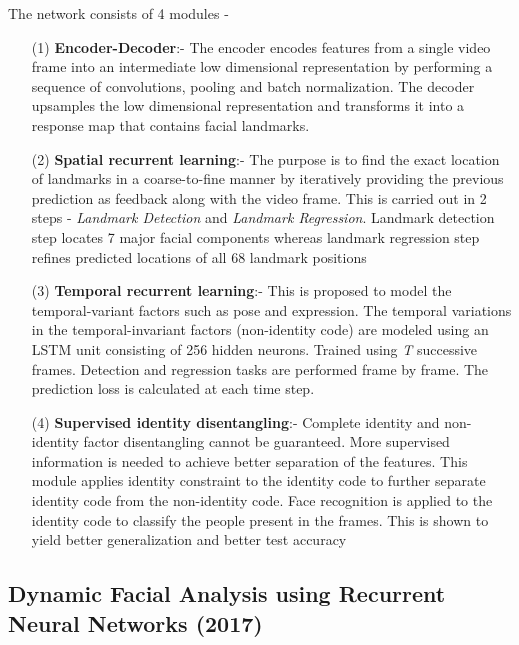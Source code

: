 \documentclass{llncs}
\begin{document}
The network consists of 4 modules -
\begin{itemize}
\item[(1)] \textbf{Encoder-Decoder}:-
The encoder encodes features from a single video frame into an intermediate low dimensional representation by performing a sequence of convolutions, pooling and batch normalization. The decoder upsamples the low dimensional representation and transforms it into a response map that contains facial landmarks.\\


\item[(2)] \textbf{Spatial recurrent learning}:-
The purpose is to find the exact location of landmarks in a coarse-to-fine manner by iteratively providing the previous prediction as feedback along with the video frame. This is carried out in 2 steps - \textit{Landmark Detection} and \textit{Landmark Regression}. Landmark detection step locates 7 major facial components whereas landmark regression step refines predicted locations of all 68 landmark positions\\

\item[(3)] \textbf{Temporal recurrent learning}:-
This is proposed to model the temporal-variant factors such as pose and expression. The temporal variations in the temporal-invariant factors (non-identity code) are modeled using an LSTM unit consisting of 256 hidden neurons.
Trained using \textit{T} successive frames. Detection and regression tasks are performed frame by frame. The prediction loss is calculated at each time step. 
\\

\item[(4)] \textbf{Supervised identity disentangling}:-
Complete identity and non-identity factor disentangling cannot be guaranteed. More supervised information is needed to achieve better separation of the features. This module applies identity constraint to the identity code to further separate identity code from the non-identity code. Face recognition is applied to the identity code to classify the people present in the frames. This is shown to yield better generalization and better test accuracy\\
\end{itemize}
 

\subsection{Dynamic Facial Analysis using Recurrent Neural Networks (2017) \cite{dynamic_facial_analysis}}
\end{document}
